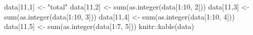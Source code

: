 \documentclass[
]{article}
\newenvironment{Shaded}{\begin{snugshade}}{\end{snugshade}}
\newcommand{\DecValTok}[1]{\textcolor[rgb]{0.00,0.00,0.81}{#1}}
\newcommand{\FunctionTok}[1]{\textcolor[rgb]{0.00,0.00,0.00}{#1}}
\newcommand{\NormalTok}[1]{#1}
\newcommand{\OtherTok}[1]{\textcolor[rgb]{0.56,0.35,0.01}{#1}}
\newcommand{\SpecialCharTok}[1]{\textcolor[rgb]{0.00,0.00,0.00}{#1}}
\newcommand{\StringTok}[1]{\textcolor[rgb]{0.31,0.60,0.02}{#1}}
\begin{document}
\begin{Shaded}
\begin{Highlighting}[]
\NormalTok{data[}\DecValTok{11}\NormalTok{,}\DecValTok{1}\NormalTok{] }\OtherTok{\textless{}{-}} \StringTok{"total"}
\NormalTok{data[}\DecValTok{11}\NormalTok{,}\DecValTok{2}\NormalTok{] }\OtherTok{\textless{}{-}} \FunctionTok{sum}\NormalTok{(}\FunctionTok{as.integer}\NormalTok{(data[}\DecValTok{1}\SpecialCharTok{:}\DecValTok{10}\NormalTok{, }\DecValTok{2}\NormalTok{]))}
\NormalTok{data[}\DecValTok{11}\NormalTok{,}\DecValTok{3}\NormalTok{] }\OtherTok{\textless{}{-}} \FunctionTok{sum}\NormalTok{(}\FunctionTok{as.integer}\NormalTok{(data[}\DecValTok{1}\SpecialCharTok{:}\DecValTok{10}\NormalTok{, }\DecValTok{3}\NormalTok{]))}
\NormalTok{data[}\DecValTok{11}\NormalTok{,}\DecValTok{4}\NormalTok{] }\OtherTok{\textless{}{-}} \FunctionTok{sum}\NormalTok{(}\FunctionTok{as.integer}\NormalTok{(data[}\DecValTok{1}\SpecialCharTok{:}\DecValTok{10}\NormalTok{, }\DecValTok{4}\NormalTok{]))}
\NormalTok{data[}\DecValTok{11}\NormalTok{,}\DecValTok{5}\NormalTok{] }\OtherTok{\textless{}{-}} \FunctionTok{sum}\NormalTok{(}\FunctionTok{as.integer}\NormalTok{(data[}\DecValTok{1}\SpecialCharTok{:}\DecValTok{7}\NormalTok{, }\DecValTok{5}\NormalTok{]))}
\NormalTok{knitr}\SpecialCharTok{::}\FunctionTok{kable}\NormalTok{(data)}
\end{Highlighting}
\end{Shaded}
\end{document}
